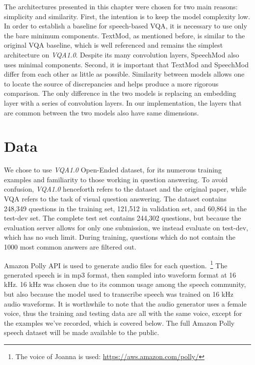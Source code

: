 \documentclass[letterpaper]{article} %
\begin{document}
The architectures presented in this chapter were chosen for two main reasons: simplicity and similarity. First, the intention is to keep the model complexity low. In order to establish a baseline for speech-based VQA, it is necessary to use only the bare minimum components. TextMod, as mentioned before, is similar to the original VQA baseline, which is well referenced and remains the simplest architecture on \textit{VQA1.0}. Despite its many convolution layers, SpeechMod also uses minimal components. Second, it is important that TextMod and SpeechMod differ from each other as little as possible. Similarity between models allows one to locate the source of discrepancies and helps produce a more rigorous comparison. The only difference in the two models is replacing an embedding layer with a series of convolution layers. In our implementation, the layers that are common between the two models also have same dimensions.


\section{Data}
We chose to use \textit{VQA1.0} Open-Ended dataset, for its numerous training examples and familiarity to those working in question answering. To avoid confusion, \textit{VQA1.0} henceforth refers to the dataset and the original paper, while VQA refers to the task of visual question answering. The dataset contains 248,349 questions in the training set, 121,512 in validation set, and 60,864 in the test-dev set. The complete test set contains 244,302 questions, but because the evaluation server allows for only one submission, we instead evaluate on test-dev, which has no such limit. During training, questions which do not contain the 1000 most common answers are filtered out.

Amazon Polly API is used to generate audio files for each question.~\footnote{The voice of Joanna is used: \url{https://aws.amazon.com/polly/}} The generated speech is in mp3 format, then sampled into waveform format at 16 kHz. 16 kHz was chosen due to its common usage among the speech community, but also because the model used to transcribe speech was trained on 16 kHz audio waveforms. It is worthwhile to note that the audio generator uses a female voice, thus the training and testing data are all with the same voice, except for the examples we’ve recorded, which is covered below. The full Amazon Polly speech dataset will be made available to the public.
\end{document}
